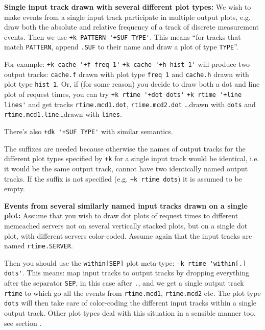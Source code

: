 \documentclass{article}
\begin{document}
\textbf{Single input track drawn with several different plot types:} We wish to make events from a single input track participate in multiple output plots, e.g. draw both the absolute and relative frequency of a track of discrete measurement events. Then we use \verb|+k PATTERN '+SUF TYPE'|. This means ``for tracks that match \verb|PATTERN|, append \verb|.SUF| to their name and draw a plot of type \verb|TYPE|''. 

For example: \verb|+k cache '+f freq 1'| \verb|+k cache '+h hist 1'| will produce two output tracks: \verb|cache.f| drawn with plot type \verb|freq 1| and \verb|cache.h| drawn with plot type \verb|hist 1|. Or, if (for some reason) you decide to draw both a dot and line plot of request times, you can try \verb|+k rtime '+dot dots'| \verb|+k rtime '+line lines'| and get tracks \verb|rtime.mcd1.dot|, \verb|rtime.mcd2.dot| \ldots drawn with \verb|dots| and \verb|rtime.mcd1.line|\ldots drawn with \verb|lines|. 

There's also \verb|+dk '+SUF TYPE'| with similar semantics. 

The suffixes are needed because otherwise the names of output tracks for the different plot types specified by \verb|+k| for a single input track would be identical, i.e. it would be the same output track, \timeplot{} cannot have two identically named output tracks. If the suffix is not specified (e.g. \verb|+k rtime dots|) it is assumed to be empty.

\textbf{Events from several similarly named input tracks drawn on a single plot:} Assume that you wish to draw dot plots of request times to different memcached servers not on several vertically stacked plots, but on a single dot plot, with different servers color-coded. Assume again that the input tracks are named \verb|rtime.SERVER|. 

Then you should use the \verb|within[SEP]| plot meta-type: \verb|-k rtime 'within[.] dots'|. This means: map input tracks to output tracks by dropping everything after the separator \verb|SEP|, in this case after \verb|.|, and we get a single output track \verb|rtime| to which go all the events from \verb|rtime.mcd1|, \verb|rtime.mcd2| etc. The plot type \verb|dots| will then take care of color-coding the different input tracks within a single output track. Other plot types deal with this situation in a sensible manner too, see section .

\pagebreak
\end{document}
